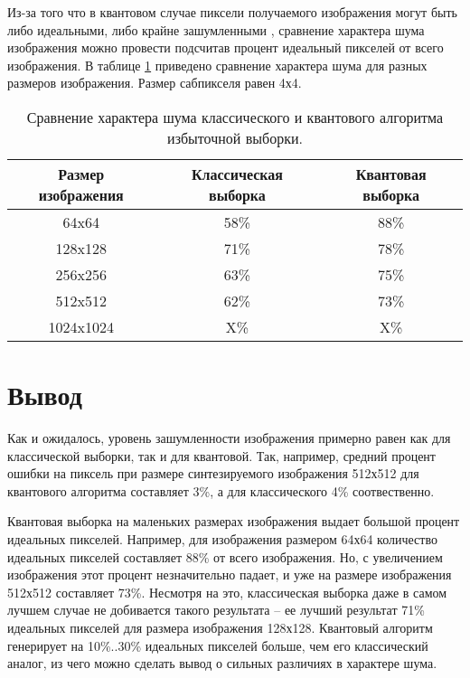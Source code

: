 Из-за того что в квантовом случае пиксели получаемого изображения могут быть либо идеальными, либо крайне зашумленными \cite{PQC-classic}, сравнение характера шума  изображения можно провести подсчитав процент идеальный пикселей от всего изображения. 
В таблице \ref{tab:noise_02} приведено сравнение характера шума для разных размеров изображения. Размер сабпикселя равен 4х4.

\begin{table}[h!]
	\label{tab:noise_02}
	\caption{Сравнение характера шума классического и квантового алгоритма избыточной выборки.}
	\begin{center}
		\begin{tabular}{|c c c|} 
			\hline
			Размер изображения & Классическая выборка & Квантовая выборка \\  
			\hline
			64x64 & 58\% & 88\%  \\
			\hline
			128x128 & 71\% & 78\% \\
			\hline
			256x256 & 63\% & 75\% \\
			\hline
			512x512 & 62\% & 73\% \\
			\hline
			1024x1024 & X\% & X\% \\
			\hline
		\end{tabular}
	\end{center}
\end{table}


\section*{Вывод}

Как и ожидалось, уровень зашумленности изображения примерно равен как для классической выборки, так и для квантовой. Так, например, средний процент ошибки на пиксель при размере синтезируемого изображения 512х512 для квантового алгоритма составляет 3\%, а для классического 4\% соотвественно.

Квантовая выборка на маленьких размерах изображения выдает большой процент идеальных пикселей. Например, для изображения размером 64х64 количество идеальных пикселей составляет 88\% от всего изображения. Но, с увеличением изображения этот процент незначительно падает, и уже на размере изображения 512х512 составляет 73\%. Несмотря на это, классическая выборка даже в самом лучшем случае не добивается такого результата -- ее лучший результат 71\% идеальных пикселей для размера изображения 128х128. Квантовый алгоритм генерирует на 10\%..30\% идеальных пикселей больше, чем его классический аналог, из чего можно сделать вывод о сильных различиях в характере шума.